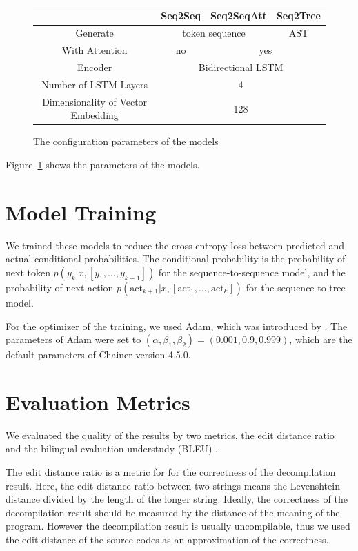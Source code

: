 \documentclass[11pt]{jarticle}
\begin{document}
\begin{figure}[t]
	\caption{The configuration parameters of the models}
	\begin{tabular}{|c||c|c|c|}
		\hline
		  & Seq2Seq & Seq2SeqAtt & Seq2Tree \\ \hline \hline
		 Generate & \multicolumn{2}{|c|}{token sequence} & AST \\ \hline
		 With Attention & no & \multicolumn{2}{|c|}{yes} \\ \hline
		 Encoder & \multicolumn{3}{|c|}{Bidirectional LSTM} \\ \hline
		Number of LSTM Layers & \multicolumn{3}{|c|}{4} \\ \hline
		Dimensionality of Vector Embedding & \multicolumn{3}{|c|}{128} \\ \hline
	\end{tabular}
	\label{fig:parameterofmodels}
\end{figure}

Figure~\ref{fig:parameterofmodels} shows the parameters of the models. 


\section{Model Training}
We trained these models to reduce the cross-entropy loss between predicted and actual conditional probabilities.
The conditional probability is the probability of next token $ p(y_k|x,[y_1,\dots,y_{k-1}]) $ for the sequence-to-sequence model, 
and the probability of next action $p(\mathrm{act}_{k+1}|x,[\mathrm{act}_1, \dots, \mathrm{act}_{k}]) $ for the sequence-to-tree model.

For the optimizer of the training, we used Adam, which was introduced by \citet{Adam}.
The parameters of Adam were set to $ (\alpha,\beta_1,\beta_2) = (0.001,0.9,0.999) $, which are the default parameters of Chainer version 4.5.0.

\section{Evaluation Metrics}
We evaluated the quality of the results by two metrics, 
the edit distance ratio \citep{Motoneta} and the bilingual evaluation understudy (BLEU) \citep{BLEU}.

The edit distance ratio is a metric for for the correctness of the decompilation result.
Here, the edit distance ratio between two strings means the Levenshtein distance \citep{levensthein_dist} divided by the length of the longer string.
Ideally, the correctness of the decompilation result should be measured by the distance of the meaning of the program.
However the decompilation result is usually uncompilable, 
thus we used the edit distance of the source codes as an approximation of the correctness.
\end{document}
